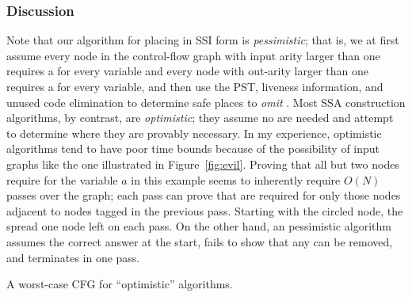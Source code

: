 \documentclass[12pt,titlepage,twoside]{article}
\newcommand{\figscale}{1.0}
\begin{document}
\subsubsection{Discussion}
Note that our algorithm for placing  in
SSI form is
\emph{pessimistic}; that is, we at first assume every node in the
control-flow graph with input arity larger than one requires a
\phifunction{} for every variable and every node with out-arity larger
than one requires a \sigfunction{} for every variable, and then use
the PST, liveness information, and unused code elimination to
determine safe places to
\emph{omit} .  Most SSA construction
algorithms, by contrast, are \emph{optimistic}; they assume no
 are needed and attempt to determine where
they are provably necessary.  In my experience, optimistic algorithms tend to
have poor time bounds because of the possibility of input graphs like
the one illustrated in Figure~\vref{fig:evil}.
Proving that all but two nodes require
 for the variable $a$ in this example seems to
inherently require $O(N)$ passes over the graph; each pass can prove
that  are required for only those nodes adjacent to
nodes tagged in the previous pass.  Starting with the circled node, the
 spread one node left on each pass. On the other hand,
an pessimistic algorithm assumes the correct answer at the start, fails
to show that any  can be removed, and
terminates in one pass.

\begin{myfigure}[t]
\centering\renewcommand{\figscale}{0.25}
\caption{A worst-case CFG for ``optimistic'' algorithms.}
\label{fig:evil}
\end{myfigure}
\end{document}
